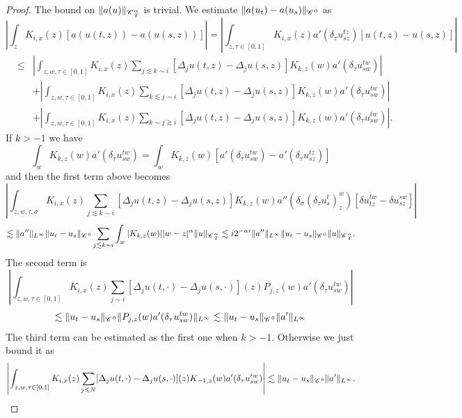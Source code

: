 \documentclass[11pt,reqno]{amsart}
\newcommand{\cdummy}{\cdot}
\newcommand{\CC}{\mathscr{C} \hspace{.1em}}
\begin{document}
\begin{proof}
  The bound on $\| a (u) \|_{\CC_T^{\alpha}}$ is trivial. We estimate $\| a
  (u_t) - a (u_s) \|_{\CC^0}$ as
  \[ \left| \int_z K_{i, x} (z) [a (u (t, z)) - a (u (s, z))] \right| = \left|
     \int_{z, \tau \in [0, 1]} K_{i, x} (z) a' (\delta_{\tau} u^{t z}_{s z})
     [u (t, z) - u (s, z)] \right| \]
  \begin{eqnarray*}
    & \leqslant & \left| \int_{z, w, \tau \in [0, 1]} K_{i, x} (z) \sum_{j
    \lesssim k \sim i} [\Delta_j u (t, z) - \Delta_j u (s, z)] K_{k, z} (w) a'
    (\delta_{\tau} u^{t w}_{s w}) \right|\\
    &  & + \left| \int_{z, w, \tau \in [0, 1]} K_{i, x} (z) \sum_{k \lesssim
    j \sim i} [\Delta_j u (t, z) - \Delta_j u (s, z)] K_{k, z} (w) a'
    (\delta_{\tau} u^{t w}_{s w}) \right|\\
    &  & + \left| \int_{z, w, \tau \in [0, 1]} K_{i, x} (z) \sum_{k \sim j
    \gtrsim i} [\Delta_j u (t, z) - \Delta_j u (s, z)] K_{k, z} (w) a'
    (\delta_{\tau} u^{t w}_{s w}) \right| .
  \end{eqnarray*}
  If $k > - 1$ we have
  \[ \int_w K_{k, z} (w) a' (\delta_{\tau} u^{t w}_{s w}) = \int_w K_{k, z}
     (w) [a' (\delta_{\tau} u^{t w}_{s w}) - a' (\delta_{\tau} u^{t z}_{s z})]
  \]
  and then the first term above becomes
  \[ \left| \int_{z, w, \tau, \sigma} K_{i, x} (z) \sum_{j \lesssim k \sim i}
     [\Delta_j u (t, z) - \Delta_j u (s, z)] K_{k, z} (w) a'' (\delta_{\sigma}
     (\delta_{\tau} u^t_s)^w_z) [\delta u^{t w}_{t z} - \delta u^{s w}_{s z}]
     \right| \]
  \[ \lesssim \| a'' \|_{L^{\infty}} \| u_t - u_s \|_{\CC^0} \sum_{j \lesssim
     k \sim i} \int_w | K_{k, z} (w) | | w - z |^{\alpha} \| u
     \|_{\CC^{\alpha}_T} \lesssim i 2^{- \alpha i} \| a'' \|_{L^{\infty}} \|
     u_t - u_s \|_{\CC^0} \| u \|_{\CC^{\alpha}_T} . \]
  The second term is
  \[ \left| \int_{z, w, \tau \in [0, 1]} K_{i, x} (z) \sum_{j \sim i}
     [\Delta_j u (t, \cdummy) - \Delta_j u (s, \cdummy)] (z) P_{j, z} (w) a'
     (\delta_{\tau} u^{t w}_{s w}) \right| \]
  \[ \lesssim \| u_t - u_s \|_{\CC^0} \| P_{j, z} (w) a' (\delta_{\tau} u^{t
     w}_{s w}) \|_{L^{\infty}} \lesssim \| u_t - u_s \|_{\CC^0} \| a'
     \|_{L^{\infty}} \]
  The third term can be estimated as the first one when $k > - 1$. Otherwise
  we just bound it as
  \[ \left| \int_{z, w, \tau \in [0, 1]} K_{i, x} (z) \sum_{j \leqslant N}
     [\Delta_j u (t, \cdummy) - \Delta_j u (s, \cdummy)] (z) K_{- 1, z} (w) a'
     (\delta_{\tau} u^{t w}_{s w}) \right| \lesssim \| u_t - u_s \|_{\CC^0} \|
     a' \|_{L^{\infty}} . \]
  

\end{proof}
\end{document}
